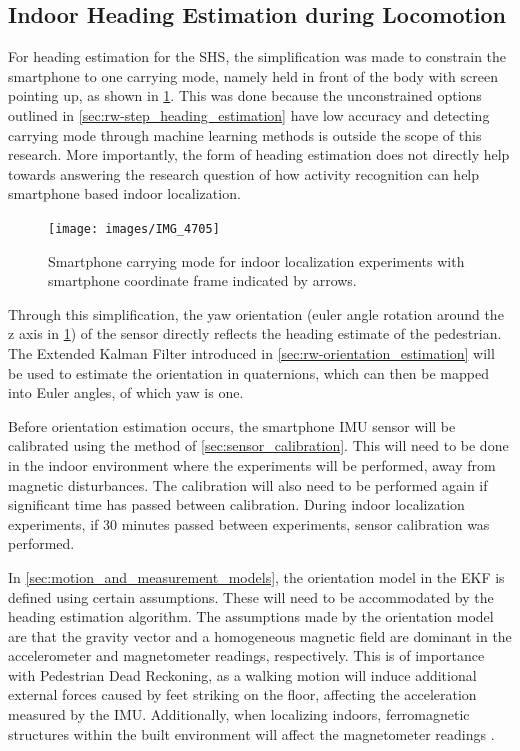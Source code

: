 \newpage
\subsection{Indoor Heading Estimation during Locomotion}

For heading estimation for the \ac{SHS}, the simplification was made to constrain the smartphone to one carrying mode, namely held in front of the body with screen pointing up, as shown in \cref{fig:experiment_carrying_position}. This was done because the unconstrained options outlined in \cref{sec:rw-step_heading_estimation} have low accuracy and detecting carrying mode through machine learning methods is outside the scope of this research. More importantly, the form of heading estimation does not directly help towards answering the research question of how activity recognition can help smartphone based indoor localization.\par 
\begin{figure}[H]
	\centering
	\texttt{[image: images/IMG\_4705]}
	\caption{Smartphone carrying mode for indoor localization experiments with smartphone coordinate frame indicated by arrows.}
	\label{fig:experiment_carrying_position}
\end{figure}
Through this simplification, the yaw orientation (euler angle rotation around the z axis in \cref{fig:experiment_carrying_position}) of the sensor directly reflects the heading estimate of the pedestrian. The Extended Kalman Filter introduced in \cref{sec:rw-orientation_estimation} will be used to estimate the orientation in quaternions, which can then be mapped into Euler angles, of which yaw is one. \par 

Before orientation estimation occurs, the smartphone \ac{IMU} sensor will be calibrated using the method of \cref{sec:sensor_calibration}. This will need to be done in the indoor environment where the experiments will be performed, away from magnetic disturbances. The calibration will also need to be performed again if significant time has passed between calibration. During indoor localization experiments, if 30 minutes passed between experiments, sensor calibration was performed.\par 

In \cref{sec:motion_and_measurement_models}, the orientation model in the EKF is defined using certain assumptions. These will need to be accommodated by the heading estimation algorithm.
The assumptions made by the orientation model  are that the gravity vector and a homogeneous magnetic field are dominant in the accelerometer and magnetometer readings, respectively. This is of importance with Pedestrian Dead Reckoning, as a walking motion will induce additional external forces caused by feet striking on the floor, affecting the acceleration measured by the IMU. Additionally, when localizing indoors, ferromagnetic structures within the built environment will affect the magnetometer readings \cite{Michel2015a}.\par 

